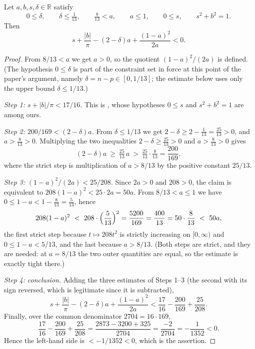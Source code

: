 \begin{lemma}
Let $a,b,s,\delta\in\mathbb{R}$ satisfy
\[
  0\le\delta,\qquad \delta\le\tfrac1{13},\qquad
  \tfrac8{13}<a,\qquad a\le1,\qquad
  0\le s,\qquad s^2+b^2=1 .
\]
Then
\[
  s+\frac{\lvert b\rvert}{\pi}-(2-\delta)a+\frac{(1-a)^2}{2a}<0 .
\]
\end{lemma}
\begin{proof}
From $8/13<a$ we get $a>0$, so the quotient $(1-a)^2/(2a)$ is defined. (The
hypothesis $0\le\delta$ is part of the constraint set in force at this point of
the paper's argument, namely $\delta=n-p\in[0,1/13]$; the estimate below uses
only the upper bound $\delta\le1/13$.)

\emph{Step 1: $s+\lvert b\rvert/\pi<17/16$.} This is ,
whose hypotheses $0\le s$ and $s^2+b^2=1$ are among ours.

\emph{Step 2: $200/169<(2-\delta)a$.} From $\delta\le1/13$ we get
$2-\delta\ge2-\tfrac1{13}=\tfrac{25}{13}>0$, and $a>\tfrac8{13}>0$. Multiplying
the two inequalities $2-\delta\ge\tfrac{25}{13}>0$ and $a>\tfrac8{13}>0$ gives
\[
  (2-\delta)a\ \ge\ \tfrac{25}{13}\,a\ >\ \tfrac{25}{13}\cdot\tfrac8{13}
  =\frac{200}{169},
\]
where the strict step is multiplication of $a>8/13$ by the positive constant
$25/13$.

\emph{Step 3: $(1-a)^2/(2a)<25/208$.} Since $2a>0$ and $208>0$, the claim is
equivalent to $208(1-a)^2<25\cdot 2a=50a$. From $8/13<a\le1$ we have
$0\le1-a<1-\tfrac8{13}=\tfrac5{13}$, hence
\[
  208(1-a)^2\ <\ 208\cdot\Bigl(\frac5{13}\Bigr)^2=\frac{5200}{169}
  =\frac{400}{13}=50\cdot\frac8{13}\ <\ 50a ,
\]
the first strict step because $t\mapsto 208t^2$ is strictly increasing on
$[0,\infty)$ and $0\le1-a<5/13$, and the last because $a>8/13$. (Both steps are
strict, and they are needed: at $a=8/13$ the two outer quantities are equal, so
the estimate is exactly tight there.)

\emph{Step 4: conclusion.} Adding the three estimates of Steps 1--3 (the second
with its sign reversed, which is legitimate since it is subtracted),
\[
  s+\frac{\lvert b\rvert}{\pi}-(2-\delta)a+\frac{(1-a)^2}{2a}
  <\frac{17}{16}-\frac{200}{169}+\frac{25}{208} .
\]
Finally, over the common denominator $2704=16\cdot169$,
\[
  \frac{17}{16}-\frac{200}{169}+\frac{25}{208}
  =\frac{2873-3200+325}{2704}=\frac{-2}{2704}=-\frac1{1352}<0 .
\]
Hence the left-hand side is $<-1/1352<0$, which is the assertion.
\end{proof}
